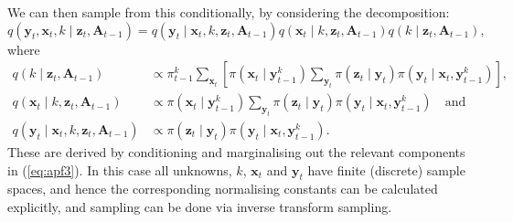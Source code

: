 \documentclass[a4paper]{article}
\newcommand{\bx}{\bm{x}}
\newcommand{\by}{\bm{y}}
\newcommand{\bz}{\bm{z}}
\newcommand{\bA}{\bm{A}}
\begin{document}
We can then sample from this conditionally, by considering the decomposition:
\begin{equation}\label{eq:qcond}
    q\left(\by_t, \bx_t, k \mid \bz_t, \bA_{t - 1}\right) = q\left(\by_t \mid \bx_t, k, \bz_t, \bA_{t - 1}\right)q\left(\bx_t \mid k, \bz_t, \bA_{t - 1}\right)q\left(k \mid \bz_t, \bA_{t - 1}\right),
\end{equation}
where
\begin{align}
    q\left(k \mid \bz_t, \bA_{t - 1}\right) &\propto \pi^k_{t - 1} \sum_{\bx_t}\left[ \pi\left(\bx_t \mid \by^k_{t - 1}\right) \sum_{\by_t} \pi\left(\bz_t \mid \by_t\right)\pi\left(\by_t \mid \bx_t, \by^k_{t - 1}\right)\right],\label{eq:sumxy}\\
    q\left(\bx_t \mid k, \bz_t, \bA_{t - 1}\right) &\propto \pi\left(\bx_t \mid \by^k_{t - 1}\right) \sum_{\by_t} \pi\left(\bz_t \mid \by_t\right)\pi\left(\by_t \mid \bx_t, \by^k_{t - 1}\right)\quad\mbox{and} \label{eq:sumy}\\
    q\left(\by_t \mid \bx_t, k, \bz_t, \bA_{t - 1}\right) &\propto \pi\left(\bz_t \mid \by_t\right)\pi\left(\by_t \mid \bx_t, \by^k_{t - 1}\right).\label{eq:sum}
\end{align}
These are derived by conditioning and marginalising out the relevant components in (\ref{eq:apf3}). In this case all unknowns, $k$, $\bx_t$ and $\by_t$ have finite (discrete) sample spaces, and hence the corresponding normalising constants can be calculated explicitly, and sampling can be done via inverse transform sampling.
\end{document}
